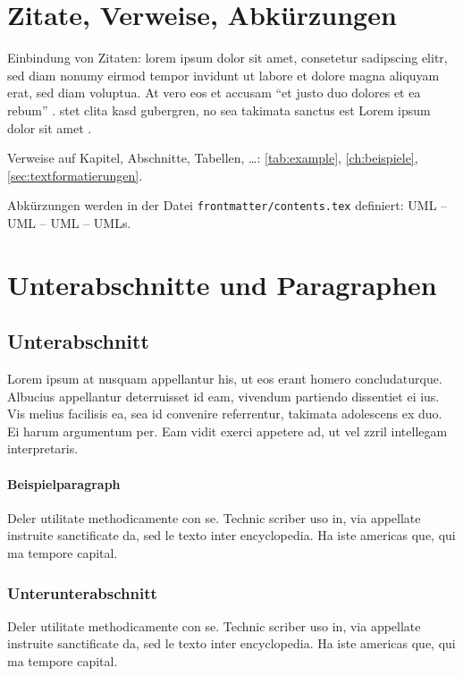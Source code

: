\section{Zitate, Verweise, Abkürzungen}

Einbindung von Zitaten: lorem ipsum dolor sit amet, consetetur sadipscing elitr, sed diam nonumy eirmod tempor invidunt ut labore et dolore magna aliquyam erat, sed diam voluptua. At vero eos et accusam ``et justo duo dolores et ea rebum'' \cite{AB00}. \cite{AB00} \cite{ABC01} stet clita kasd gubergren, no sea takimata sanctus est Lorem ipsum dolor sit amet \cite{Az09} \cite{Ez10} \cite{Gl06} \cite{GI14} \cite{Wa14} \cite{XX14} \cite{Wa14b}.

Verweise auf Kapitel, Abschnitte, Tabellen, \dots: \autoref{tab:example}, \autoref{ch:beispiele}, \autoref{sec:textformatierungen}.

Abkürzungen werden in der Datei \texttt{frontmatter/contents.tex} definiert: \ac{UML} -- \acs{UML} -- \acf{UML} -- \acp{UML}. 

\section{Unterabschnitte und Paragraphen}
\subsection{Unterabschnitt}
Lorem ipsum at nusquam appellantur his, ut eos erant homero concludaturque. Albucius appellantur deterruisset id eam, vivendum partiendo dissentiet ei ius. Vis melius facilisis ea, sea id convenire referrentur, takimata adolescens ex duo. Ei harum argumentum per. Eam vidit exerci appetere ad, ut vel zzril intellegam interpretaris.

\paragraph{Beispielparagraph} 
Deler utilitate methodicamente con se. Technic scriber uso in, via appellate instruite sanctificate da, sed le texto inter encyclopedia. Ha iste americas que, qui ma tempore capital. 

\subsubsection{Unterunterabschnitt}
Deler utilitate methodicamente con se. Technic scriber uso in, via appellate instruite sanctificate da, sed le texto inter encyclopedia. Ha iste americas que, qui ma tempore capital. 


